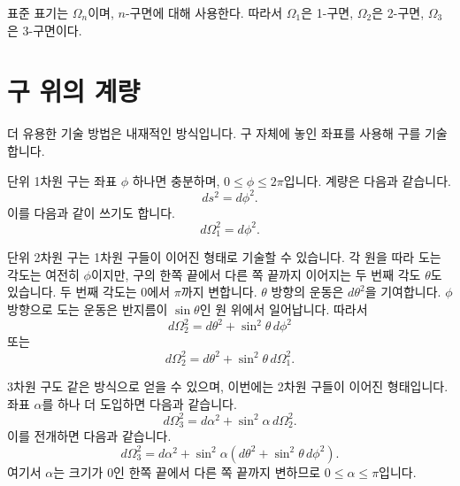 표준 표기는 \(\Omega_n\)이며, \(n\)-구면에 대해 사용한다. 따라서 \(\Omega_1\)은 1-구면, \(\Omega_2\)은 2-구면, \(\Omega_3\)은 3-구면이다.

\section{구 위의 계량}

더 유용한 기술 방법은 내재적인 방식입니다. 구 자체에 놓인 좌표를 사용해 구를 기술합니다.

단위 1차원 구는 좌표 \(\phi\) 하나면 충분하며, \(0\leq \phi \leq 2\pi\)입니다. 계량은 다음과 같습니다.
\begin{equation}
ds^2=d\phi^2.
\end{equation}
이를 다음과 같이 쓰기도 합니다.
\begin{equation}
d\Omega_1^2=d\phi^2.
\end{equation}

단위 2차원 구는 1차원 구들이 이어진 형태로 기술할 수 있습니다. 각 원을 따라 도는 각도는 여전히 \(\phi\)이지만, 구의 한쪽 끝에서 다른 쪽 끝까지 이어지는 두 번째 각도 \(\theta\)도 있습니다. 두 번째 각도는 \(0\)에서 \(\pi\)까지 변합니다. \(\theta\) 방향의 운동은 \(d\theta^2\)을 기여합니다. \(\phi\) 방향으로 도는 운동은 반지름이 \(\sin\theta\)인 원 위에서 일어납니다. 따라서
\begin{equation}
d\Omega_2^2=d\theta^2+\sin^2\theta\,d\phi^2
\end{equation}
또는
\begin{equation}
d\Omega_2^2=d\theta^2+\sin^2\theta\,d\Omega_1^2.
\end{equation}

3차원 구도 같은 방식으로 얻을 수 있으며, 이번에는 2차원 구들이 이어진 형태입니다. 좌표 \(\alpha\)를 하나 더 도입하면 다음과 같습니다.
\begin{equation}
d\Omega_3^2=d\alpha^2+\sin^2\alpha\,d\Omega_2^2.
\end{equation}
이를 전개하면 다음과 같습니다.
\begin{equation}
d\Omega_3^2=d\alpha^2+\sin^2\alpha\left(d\theta^2+\sin^2\theta\,d\phi^2\right).
\end{equation}
여기서 \(\alpha\)는 크기가 0인 한쪽 끝에서 다른 쪽 끝까지 변하므로 \(0\leq \alpha \leq \pi\)입니다.

